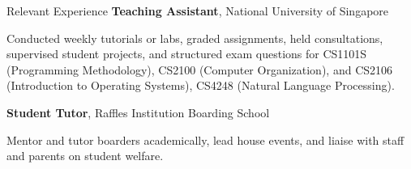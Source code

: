 \begin{rubric}{Relevant Experience}
    \textbf{Teaching Assistant}, National University of Singapore\par
    Conducted weekly tutorials or labs, graded assignments, held consultations, supervised student projects, and structured exam questions for CS1101S (Programming Methodology), CS2100 (Computer Organization), and CS2106 (Introduction to Operating Systems), CS4248 (Natural Language Processing).

    \textbf{Student Tutor}, Raffles Institution Boarding School\par
    Mentor and tutor boarders academically, lead house events, and liaise with staff and parents on student welfare.

\end{rubric}
